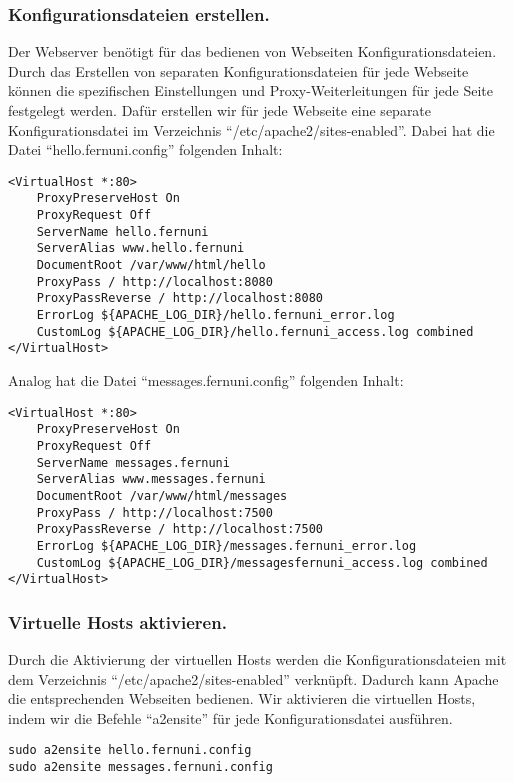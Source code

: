 \subsubsection*{Konfigurationsdateien erstellen.}

Der Webserver benötigt für das bedienen von Webseiten Konfigurationsdateien.
Durch das Erstellen von separaten Konfigurationsdateien für jede Webseite können die spezifischen Einstellungen und Proxy-Weiterleitungen für jede Seite festgelegt werden.
Dafür erstellen wir für jede Webseite eine separate Konfigurationsdatei im Verzeichnis \enquote{/etc/apache2/sites-enabled}. 
Dabei hat die Datei \enquote{hello.fernuni.config} folgenden Inhalt:
\begin{verbatim}
<VirtualHost *:80> 
    ProxyPreserveHost On
    ProxyRequest Off
    ServerName hello.fernuni 
    ServerAlias www.hello.fernuni 
    DocumentRoot /var/www/html/hello
    ProxyPass / http://localhost:8080
    ProxyPassReverse / http://localhost:8080
    ErrorLog ${APACHE_LOG_DIR}/hello.fernuni_error.log
    CustomLog ${APACHE_LOG_DIR}/hello.fernuni_access.log combined
</VirtualHost>
\end{verbatim}

Analog hat die Datei \enquote{messages.fernuni.config} folgenden Inhalt:
\begin{verbatim}
<VirtualHost *:80> 
    ProxyPreserveHost On
    ProxyRequest Off
    ServerName messages.fernuni 
    ServerAlias www.messages.fernuni 
    DocumentRoot /var/www/html/messages
    ProxyPass / http://localhost:7500
    ProxyPassReverse / http://localhost:7500
    ErrorLog ${APACHE_LOG_DIR}/messages.fernuni_error.log
    CustomLog ${APACHE_LOG_DIR}/messagesfernuni_access.log combined
</VirtualHost>
\end{verbatim}

\subsubsection*{Virtuelle Hosts aktivieren.}
Durch die Aktivierung der virtuellen Hosts werden die Konfigurationsdateien mit dem Verzeichnis \enquote{/etc/apache2/sites-enabled} verknüpft. Dadurch kann Apache die entsprechenden Webseiten bedienen.
Wir aktivieren die virtuellen Hosts, indem wir die Befehle \enquote{a2ensite} für jede Konfigurationsdatei ausführen.

\begin{verbatim}
sudo a2ensite hello.fernuni.config
sudo a2ensite messages.fernuni.config
\end{verbatim}

